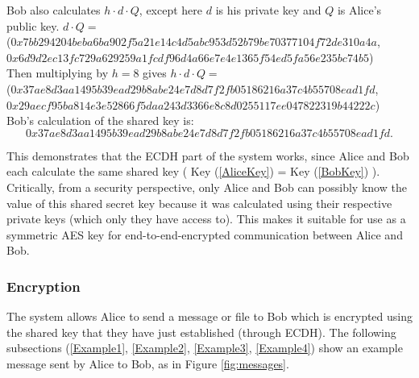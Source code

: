 \documentclass[12pt,a4paper]{article}
\begin{document}
Bob also calculates $h \cdot d \cdot Q$, except here $d$ is his private key and $Q$ is Alice's public key. 
$d \cdot Q = $ \\
({\footnotesize $0x7bb294204beba6ba902f5a21e14c4d5abc953d52b79be70377104f72de310a4a$}, \\
{\footnotesize $0x6d9d2ec13fc729a629259a1fcdf96d4a66e7e4e1365f54ed5fa56e235bc74b5$}) \\
Then multiplying by $h = 8$ gives $h \cdot d \cdot Q = $\\
({\footnotesize $0x37ae8d3aa1495b39ead29b8abe24e7d8d7f2fb05186216a37c4b55708ead1fd$}, \\
{\footnotesize $0x29aecf95ba814e3e52866f5daa243d3366e8c8d0255117ee047822319b44222c$}) \\
Bob's calculation of the shared key is: 
\begin{equation} \label{BobKey}
    0x37ae8d3aa1495b39ead29b8abe24e7d8d7f2fb05186216a37c4b55708ead1fd.
\end{equation}

This demonstrates that the ECDH part of the system works, since Alice and Bob each calculate the same shared key ( Key (\ref{AliceKey}) = Key (\ref{BobKey}) ). 
Critically, from a security perspective, only Alice and Bob can possibly know the value of this shared secret key 
because it was calculated using their respective private keys (which only they have access to). 
This makes it suitable for use as a symmetric AES key for end-to-end-encrypted communication between Alice and Bob. 


\subsubsection{Encryption} \noindent \label{Example1}
The system allows Alice to send a message or file to Bob which is encrypted using the shared key that they have just established (through ECDH). 
The following subsections (\ref{Example1}, \ref{Example2}, \ref{Example3}, \ref{Example4}) show an example message sent by Alice to Bob, 
as in Figure \ref{fig:messages}. 

\vspace{1mm}
\end{document}
